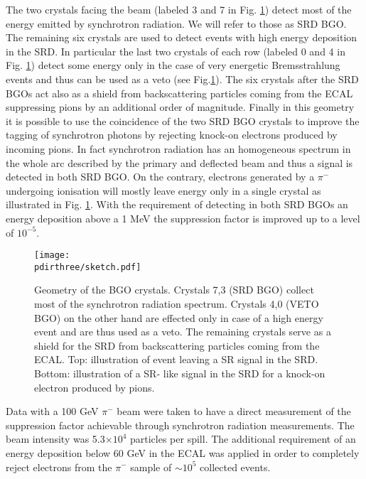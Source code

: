 The two crystals facing the beam (labeled 3 and 7 in Fig. \ref{fig:newgeo}) detect most of the energy emitted by synchrotron radiation. We will refer to those as SRD BGO. The remaining six crystals are used to detect events with high energy deposition in the SRD. In particular the last two crystals of each row (labeled 0 and 4 in Fig. \ref{fig:newgeo}) detect some energy only in the case of very energetic Bremsstrahlung events and thus can be used as a veto (see Fig.\ref{fig:newgeo}). The six crystals after the SRD BGOs act also as a shield from backscattering particles coming from the ECAL suppressing pions by an additional order of magnitude. Finally in this geometry it is possible to use the coincidence of the two SRD BGO crystals to improve the tagging of synchrotron photons by rejecting knock-on electrons produced by incoming pions. In fact synchrotron radiation has an homogeneous spectrum in the whole arc described by the primary and deflected beam and thus a signal is detected in both SRD BGO. On the contrary, electrons generated by a $\pi^-$ undergoing ionisation will mostly leave energy only in a single crystal as illustrated in Fig. \ref{fig:newgeo}. 
With the requirement of detecting in both SRD BGOs an energy deposition above a 1 MeV the suppression factor is improved up to a level of $10^{-5}$.



\begin{figure}[htb!]
  \centering
  \texttt{[image: \\pdirthree/sketch.pdf]}
  \caption[Geometry of the BGO crystals]{Geometry of the BGO crystals. Crystals 7,3 (SRD BGO) collect most of the synchrotron radiation spectrum. Crystals 4,0 (VETO BGO) on the other hand are effected only in case of a high energy event and are thus used as a veto. The remaining crystals serve as a shield for the SRD from backscattering particles coming from the ECAL. Top: illustration of event leaving a SR signal in the SRD. Bottom: illustration of a SR- like signal in the SRD for a knock-on electron produced by pions.}
\label{fig:newgeo}
\end{figure}

Data with a 100 GeV $\pi^-$ beam were taken to have a direct measurement of the suppression factor achievable through synchrotron radiation measurements. The beam intensity was 5.3$\times 10^4$ particles per spill. The additional requirement of an energy deposition below 60 GeV in the ECAL was applied in order to completely reject electrons from the $\pi^-$ sample of $\sim 10^5$ collected events.

